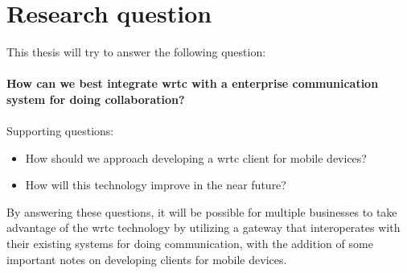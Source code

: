 



\section{Research question}
This thesis will try to answer the following question:
\\
\\
\textbf{How can we best integrate \gls{wrtc} with a enterprise communication system for doing collaboration?}
\\
\\
Supporting questions:

\begin{itemize}
    \item How should we approach developing a \gls{wrtc} client for mobile devices?
    \item How will this technology improve in the near future?
\end{itemize}

By answering these questions, it will be possible for multiple businesses to take advantage of the \gls{wrtc} technology by utilizing a gateway that interoperates with their existing systems for doing communication, with the addition of some important notes on developing clients for mobile devices.

